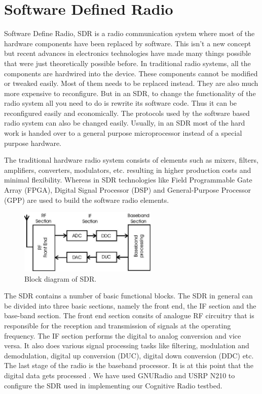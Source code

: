 \chapter{Software Defined Radio}

Software Define Radio, SDR is a radio communication system where most of the 
hardware components have been replaced by software. This isn't a new concept
but recent advances in electronics technologies have made many things possible
that were just theoretically possible before. In traditional radio systems,
all the components are hardwired into the device. These components cannot be
modified or tweaked easily. Most of them needs to be replaced instead. They
are also much more expensive to reconfigure. But in an SDR, to change the
functionality of the radio system all you need to do is rewrite its software
code. Thus it can be reconfigured easily and economically. The protocols used
by the software based radio system can also be changed easily. Usually, in 
an SDR most of the hard work is handed over to a general purpose 
microprocessor instead of a special purpose hardware.

The traditional hardware radio system consists of elements such as mixers, 
filters, amplifiers, converters, modulators, etc. resulting in higher 
production costs and minimal flexibility. Whereas in SDR technologies like 
Field Programmable Gate Array (FPGA), Digital Signal Processor (DSP) and 
General-Purpose Processor (GPP) are used to build the software radio elements.


\begin{figure}
  \centering
  \includegraphics[width=0.59\textwidth]{sdrBlock}
  \caption{Block diagram of SDR.}
  \label{sdrBlock}
\end{figure}

The SDR contains a number of basic functional blocks.
The SDR in general can be divided into three basic sections, namely the front
end, the IF section and the base-band section. The front end section consits 
of analogue RF circuitry that is responsible for the reception and 
transmission of signals at the operating frequency. The IF section performs
the digital to analog conversion and vice versa. It also does various signal 
processing tasks like filtering, modulation and demodulation, digital up 
conversion (DUC), digital down conversion (DDC) etc. The last stage of the 
radio is the baseband processor. It is at this point that the digital data 
gets processed \cite{miller08}\cite{kranthi13}.
We have used GNURadio and USRP N210 to configure the SDR used in implementing
our Cognitive Radio testbed. 

